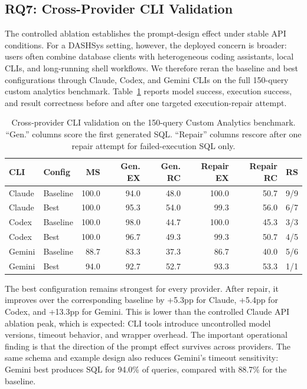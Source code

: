 \documentclass[sigconf, nonacm]{acmart}
\begin{document}
\subsection{RQ7: Cross-Provider CLI Validation}
\label{sec:cli-validation}

The controlled ablation establishes the prompt-design effect under stable API conditions. For a DASHSys setting, however, the deployed concern is broader: users often combine database clients with heterogeneous coding assistants, local CLIs, and long-running shell workflows. We therefore reran the baseline and best configurations through Claude, Codex, and Gemini CLIs on the full 150-query custom analytics benchmark. Table~\ref{tab:cli-validation} reports model success, execution success, and result correctness before and after one targeted execution-repair attempt.

\begin{table}[t]
\caption{Cross-provider CLI validation on the 150-query Custom Analytics benchmark. ``Gen.'' columns score the first generated SQL. ``Repair'' columns rescore after one repair attempt for failed-execution SQL only.}
\label{tab:cli-validation}
\centering
\small
\begin{tabular}{llrrrrrr}
\toprule
\textbf{CLI} & \textbf{Config} & \textbf{MS} & \textbf{Gen. EX} & \textbf{Gen. RC} & \textbf{Repair EX} & \textbf{Repair RC} & \textbf{RS} \\
\midrule
Claude & Baseline & 100.0 & 94.0 & 48.0 & 100.0 & 50.7 & 9/9 \\
Claude & Best & 100.0 & 95.3 & 54.0 & 99.3 & 56.0 & 6/7 \\
Codex & Baseline & 100.0 & 98.0 & 44.7 & 100.0 & 45.3 & 3/3 \\
Codex & Best & 100.0 & 96.7 & 49.3 & 99.3 & 50.7 & 4/5 \\
Gemini & Baseline & 88.7 & 83.3 & 37.3 & 86.7 & 40.0 & 5/6 \\
Gemini & Best & 94.0 & 92.7 & 52.7 & 93.3 & 53.3 & 1/1 \\
\bottomrule
\end{tabular}
\end{table}

The best configuration remains strongest for every provider. After repair, it improves over the corresponding baseline by +5.3pp for Claude, +5.4pp for Codex, and +13.3pp for Gemini. This is lower than the controlled Claude API ablation peak, which is expected: CLI tools introduce uncontrolled model versions, timeout behavior, and wrapper overhead. The important operational finding is that the direction of the prompt effect survives across providers. The same schema and example design also reduces Gemini's timeout sensitivity: Gemini best produces SQL for 94.0\% of queries, compared with 88.7\% for the baseline.
\end{document}
